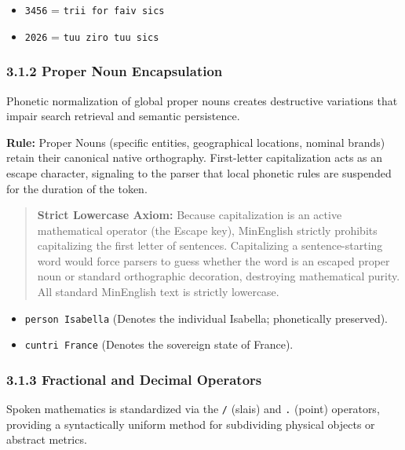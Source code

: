 \begin{itemize}
\tightlist
\item
  \texttt{3456} = \texttt{trii\ for\ faiv\ sics}
\item
  \texttt{2026} = \texttt{tuu\ ziro\ tuu\ sics}
\end{itemize}

\subsubsection{3.1.2 Proper Noun
Encapsulation}\label{proper-noun-encapsulation}

Phonetic normalization of global proper nouns creates destructive
variations that impair search retrieval and semantic persistence.

\textbf{Rule:} Proper Nouns (specific entities, geographical locations,
nominal brands) retain their canonical native orthography. First-letter
capitalization acts as an escape character, signaling to the parser that
local phonetic rules are suspended for the duration of the token.

\begin{quote}
\textbf{Strict Lowercase Axiom:} Because capitalization is an active
mathematical operator (the Escape key), MinEnglish strictly prohibits
capitalizing the first letter of sentences. Capitalizing a
sentence-starting word would force parsers to guess whether the word is
an escaped proper noun or standard orthographic decoration, destroying
mathematical purity. All standard MinEnglish text is strictly lowercase.
\end{quote}

\begin{itemize}
\tightlist
\item
  \texttt{person\ Isabella} (Denotes the individual Isabella;
  phonetically preserved).
\item
  \texttt{cuntri\ France} (Denotes the sovereign state of France).
\end{itemize}

\subsubsection{3.1.3 Fractional and Decimal
Operators}\label{fractional-and-decimal-operators}

Spoken mathematics is standardized via the \texttt{/} (slais) and
\texttt{.} (point) operators, providing a syntactically uniform method
for subdividing physical objects or abstract metrics.


